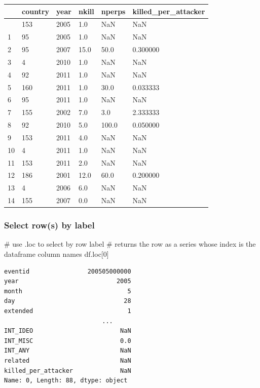 \documentclass[
  letterpaper,
  DIV=11,
  numbers=noendperiod]{scrreprt}
\newenvironment{Shaded}{\begin{snugshade}}{\end{snugshade}}
\newcommand{\CommentTok}[1]{\textcolor[rgb]{0.37,0.37,0.37}{#1}}
\newcommand{\DecValTok}[1]{\textcolor[rgb]{0.68,0.00,0.00}{#1}}
\newcommand{\NormalTok}[1]{\textcolor[rgb]{0.00,0.23,0.31}{#1}}
\begin{document}
\begin{longtable}[]{@{}llllll@{}}
\toprule\noalign{}
& country & year & nkill & nperps & killed\_per\_attacker \\
\midrule\noalign{}
\endhead
\bottomrule\noalign{}
\endlastfoot
0 & 153 & 2005 & 1.0 & NaN & NaN \\
1 & 95 & 2005 & 1.0 & NaN & NaN \\
2 & 95 & 2007 & 15.0 & 50.0 & 0.300000 \\
3 & 4 & 2010 & 1.0 & NaN & NaN \\
4 & 92 & 2011 & 1.0 & NaN & NaN \\
5 & 160 & 2011 & 1.0 & 30.0 & 0.033333 \\
6 & 95 & 2011 & 1.0 & NaN & NaN \\
7 & 155 & 2002 & 7.0 & 3.0 & 2.333333 \\
8 & 92 & 2010 & 5.0 & 100.0 & 0.050000 \\
9 & 153 & 2011 & 4.0 & NaN & NaN \\
10 & 4 & 2011 & 1.0 & NaN & NaN \\
11 & 153 & 2011 & 2.0 & NaN & NaN \\
12 & 186 & 2001 & 12.0 & 60.0 & 0.200000 \\
13 & 4 & 2006 & 6.0 & NaN & NaN \\
14 & 155 & 2007 & 0.0 & NaN & NaN \\
\end{longtable}

\subsubsection{Select row(s) by label}\label{select-rows-by-label}

\begin{Shaded}
\begin{Highlighting}[]
\CommentTok{\# use .loc to select by row label}
\CommentTok{\# returns the row as a series whose index is the dataframe column names}
\NormalTok{df.loc[}\DecValTok{0}\NormalTok{]}
\end{Highlighting}
\end{Shaded}

\begin{verbatim}
eventid                200505000000
year                           2005
month                             5
day                              28
extended                          1
                           ...     
INT_IDEO                        NaN
INT_MISC                        0.0
INT_ANY                         NaN
related                         NaN
killed_per_attacker             NaN
Name: 0, Length: 88, dtype: object
\end{verbatim}
\end{document}
